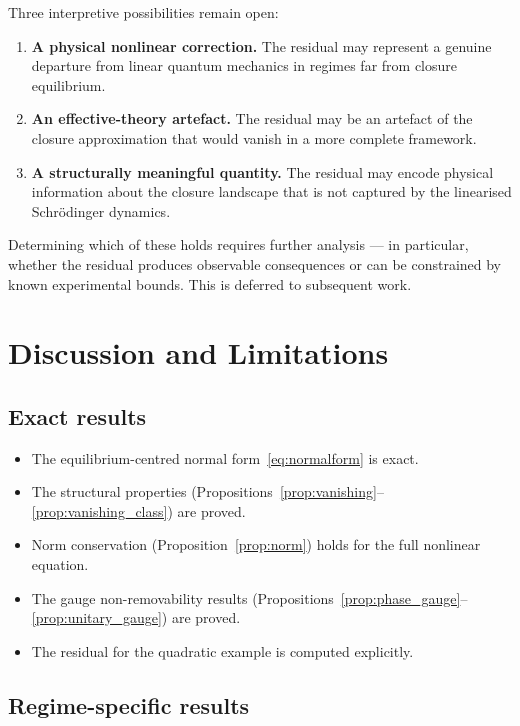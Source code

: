 \documentclass[12pt]{article}
\begin{document}
Three interpretive possibilities remain open:
\begin{enumerate}
    \item \textbf{A physical nonlinear correction.} The residual may represent a genuine departure from linear quantum mechanics in regimes far from closure equilibrium.
    \item \textbf{An effective-theory artefact.} The residual may be an artefact of the closure approximation that would vanish in a more complete framework.
    \item \textbf{A structurally meaningful quantity.} The residual may encode physical information about the closure landscape that is not captured by the linearised Schr\"odinger dynamics.
\end{enumerate}

Determining which of these holds requires further analysis --- in particular, whether the residual produces observable consequences or can be constrained by known experimental bounds. This is deferred to subsequent work.

\section{Discussion and Limitations}\label{sec:discussion}

\subsection{Exact results}

\begin{itemize}
    \item The equilibrium-centred normal form~\eqref{eq:normalform} is exact.
    \item The structural properties (Propositions~\ref{prop:vanishing}--\ref{prop:vanishing_class}) are proved.
    \item Norm conservation (Proposition~\ref{prop:norm}) holds for the full nonlinear equation.
    \item The gauge non-removability results (Propositions~\ref{prop:phase_gauge}--\ref{prop:unitary_gauge}) are proved.
    \item The residual for the quadratic example is computed explicitly.
\end{itemize}

\subsection{Regime-specific results}
\end{document}

